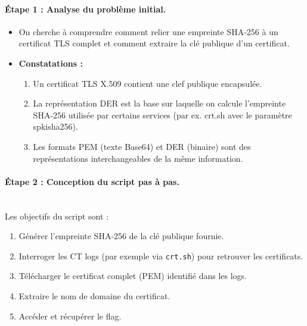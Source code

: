 \documentclass[12pt, a4paper]{article}
\begin{document}
            \paragraph{\textbf{Étape 1 : Analyse du problème initial.}} 
            \begin{itemize} 
            \item On cherche à comprendre comment relier une empreinte SHA-256 à un certificat TLS complet et comment extraire la clé publique d'un certificat. 
            \item \textbf{Constatations :} 
            \begin{enumerate} 
            \item Un certificat TLS X.509 contient une clef publique encapsulée. 
            \item La représentation DER est la base sur laquelle on calcule l'empreinte SHA-256 utilisée par certains services (par ex. crt.sh avec le paramètre spkisha256). 
            \item Les formats PEM (texte Base64) et DER (binaire) sont des représentations interchangeables de la même information. 
            \end{enumerate} 
            \end{itemize}
            
            \paragraph{\textbf{Étape 2 : Conception du script pas à pas.}}~\\
            
            Les objectifs du script sont : 
            \begin{enumerate} 
            \item Générer l'empreinte SHA-256 de la clé publique fournie. 
            \item Interroger les CT logs (par exemple via \texttt{crt.sh}) pour retrouver les certificats. 
            \item Télécharger le certificat complet (PEM) identifié dans les logs. 
            \item Extraire le nom de domaine du certificat. 
            \item Accéder et récupérer le flag. 
            \end{enumerate}
            
        
\end{document}
